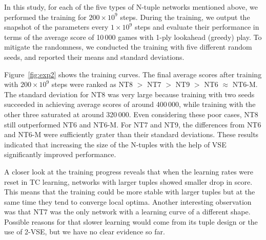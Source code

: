 In this study, for each of the five types of N-tuple networks mentioned above, we performed the training for $200 \times 10^{9}$ steps.  During the training, we output the snapshot of the parameters every $1 \times 10^9$ steps and evaluate their performance in terms of the average score of 10\,000 games with 1-ply lookahead (greedy) play.
To mitigate the randomness, we conducted the training with five different random seeds, and reported their means and standard deviations.

Figure~\ref{fig:exp2} shows the training curves.
The final average scores after training with $200 \times 10^9$ steps were ranked as \textsf{NT8} $>$ \textsf{NT7} $>$ \textsf{NT9} $>$ \textsf{NT6} $\approx$ \textsf{NT6-M}.
The standard deviation for \textsf{NT8} was very large because training with two seeds succeeded in achieving average scores of around 400\,000, while training with the other three saturated at around 320\,000.
Even considering these poor cases, \textsf{NT8} still outperformed \textsf{NT6} and \textsf{NT6-M}.
For \textsf{NT7} and \textsf{NT9}, the differences from \textsf{NT6} and \textsf{NT6-M} were sufficiently grater than their standard deviations.
These results indicated that increasing the size of the N-tuples with the help of VSE significantly improved performance.

A closer look at the training progress reveals that when the learning rates were reset in TC learning, networks with larger tuples showed smaller drop in score. This means that the training could be more stable with larger tuples but at the same time they tend to converge local optima.
Another interesting observation was that \textsf{NT7} was the only network with a learning curve of a different shape.  Possible reasons for that slower learning would come from its tuple design or the use of 2-VSE, but we have no clear evidence so far.

